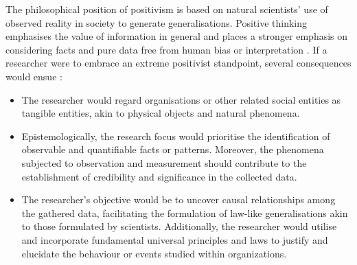 \par{The philosophical position of positivism is based on natural scientists' use of observed reality in society to generate generalisations. Positive thinking emphasises the value of information in general and places a stronger emphasis on considering facts and pure data free from human bias or interpretation \citep{saunders2009research}. If a researcher were to embrace an extreme positivist standpoint, several consequences would ensue \citep{alharahsheh2020review}:
\begin{itemize}
    \item The researcher would regard organisations or other related social entities as tangible entities, akin to physical objects and natural phenomena.
    \item Epistemologically, the research focus would prioritise the identification of observable and quantifiable facts or patterns. Moreover, the phenomena subjected to observation and measurement should contribute to the establishment of credibility and significance in the collected data.
    \item The researcher's objective would be to uncover causal relationships among the gathered data, facilitating the formulation of law-like generalisations akin to those formulated by scientists. Additionally, the researcher would utilise and incorporate fundamental universal principles and laws to justify and elucidate the behaviour or events studied within organizations.
\end{itemize}}
